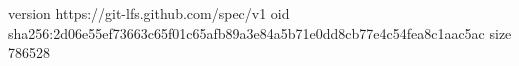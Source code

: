 version https://git-lfs.github.com/spec/v1
oid sha256:2d06e55ef73663c65f01c65afb89a3e84a5b71e0dd8cb77e4c54fea8c1aac5ac
size 786528

